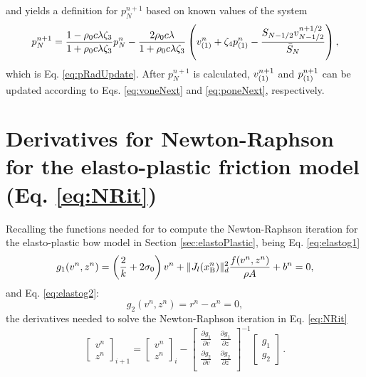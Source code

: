 and yields a definition for $p_N^{n+1}$ based on known values of the system
\begin{equation}\label{eq:pradApp}
    p_N^{n+1} = \frac{1 - \rho_0c\lambda\zeta_3}{1+\rho_0c\lambda\zeta_3}p_N^n - \frac{2\rho_0c\lambda}{1+\rho_0c\lambda\zeta_3} \left( v_{(1)}^n+\zeta_4p_{(1)}^n - \frac{S_{N-1/2}v_{N-1/2}^{n+1/2}}{\bar S_N}\right),
\end{equation}
which is Eq. \eqref{eq:pRadUpdate}. After $p_N^{n+1}$ is calculated, $v_{(1)}^{n+1}$ and $p_{(1)}^{n+1}$ can be updated according to Eqs. \eqref{eq:voneNext} and \eqref{eq:poneNext}, respectively.

\section{Derivatives for Newton-Raphson for the elasto-plastic friction model (Eq. \eqref{eq:NRit})}\label{app:elastoDeriv}
Recalling the functions needed for to compute the Newton-Raphson iteration for the elasto-plastic bow model in Section \ref{sec:elastoPlastic}, being Eq. \eqref{eq:elastog1}
\begin{equation*}
    g_1(v^n,z^n) = \left(\frac{2}{k} + 2\sigma_{0}\right)v^n + \lVert J_l(x_{\text{B}}^n)\rVert_d^2\frac{f(v^n,z^n)}{\rho A}+ b^n= 0,
\end{equation*}
and Eq. \eqref{eq:elastog2}:
\begin{equation*}
    g_2(v^n, z^n) = r^n - a^n = 0,
\end{equation*}
the derivatives needed to solve the Newton-Raphson iteration in Eq. \eqref{eq:NRit} 
\begin{equation*}
    \begin{bmatrix}
        v^n\\
        z^n
        \end{bmatrix}_{i+1}
        =
        \begin{bmatrix}
        v^n\\
        z^n
        \end{bmatrix}_i
        -
        \begin{bmatrix}
        \frac{\partial g_1}{\partial v} & \frac{\partial g_1}{\partial z}\\
        \frac{\partial g_2}{\partial v} & \frac{\partial g_2}{\partial z}\\
        \end{bmatrix}^{-1}
        \begin{bmatrix}
        g_1\\
        g_2
        \end{bmatrix}\,
        .
\end{equation*}

